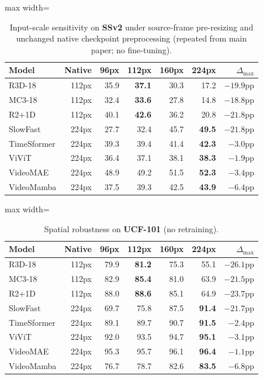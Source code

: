 \documentclass[runningheads]{llncs}
\newcommand{\tabtight}{\setlength{\tabcolsep}{3.5pt}\renewcommand{\arraystretch}{1.12}}
\newcommand{\rev}[1]{\textcolor{revblue}{#1}}
\begin{document}
\begin{table}[!htbp]
\centering
\caption{\rev{Input-scale sensitivity on \textbf{SSv2} under source-frame pre-resizing and unchanged native checkpoint preprocessing (repeated from main paper; no fine-tuning).}}
\label{tab:sup_sp_ssv2}
\scriptsize\tabtight
\begin{adjustbox}{max width=\textwidth}
\begin{tabular}{l r rrrr r}
\toprule
Model & Native & 96px & 112px & 160px & 224px & $\Delta_\text{max}$ \\
\midrule
R3D-18      & 112px & 35.9 & \textbf{37.1} & 30.3 & 17.2 & $-19.9$pp \\
MC3-18      & 112px & 32.4 & \textbf{33.6} & 27.8 & 14.8 & $-18.8$pp \\
R2+1D       & 112px & 40.1 & \textbf{42.6} & 36.2 & 20.8 & $-21.8$pp \\
SlowFast    & 224px & 27.7 & 32.4 & 45.7 & \textbf{49.5} & $-21.8$pp \\
\midrule
TimeSformer & 224px & 39.3 & 39.4 & 41.4 & \textbf{42.3} & $-3.0$pp \\
ViViT       & 224px & 36.4 & 37.1 & 38.1 & \textbf{38.3} & $-1.9$pp \\
VideoMAE    & 224px & 48.9 & 49.2 & 51.5 & \textbf{52.3} & $-3.4$pp \\
VideoMamba  & 224px & 37.5 & 39.3 & 42.5 & \textbf{43.9} & $-6.4$pp \\
\bottomrule
\end{tabular}
\end{adjustbox}
\end{table}

\begin{table}[!htbp]
\centering
\caption{Spatial robustness on \textbf{UCF-101} (no retraining).}
\label{tab:sup_sp_ucf}
\scriptsize\tabtight
\begin{adjustbox}{max width=\textwidth}
\begin{tabular}{l r rrrr r}
\toprule
Model & Native & 96px & 112px & 160px & 224px & $\Delta_\text{max}$ \\
\midrule
R3D-18      & 112px & 79.9 & \textbf{81.2} & 75.3 & 55.1 & $-26.1$pp \\
MC3-18      & 112px & 82.9 & \textbf{85.4} & 81.0 & 63.9 & $-21.5$pp \\
R2+1D       & 112px & 88.0 & \textbf{88.6} & 85.1 & 64.9 & $-23.7$pp \\
SlowFast    & 224px & 69.7 & 75.8 & 87.5 & \textbf{91.4} & $-21.7$pp \\
\midrule
TimeSformer & 224px & 89.1 & 89.7 & 90.7 & \textbf{91.5} & $-2.4$pp \\
ViViT       & 224px & 92.0 & 93.5 & 94.7 & \textbf{95.1} & $-3.1$pp \\
VideoMAE    & 224px & 95.3 & 95.7 & 96.1 & \textbf{96.4} & $-1.1$pp \\
VideoMamba  & 224px & 76.7 & 78.7 & 82.6 & \textbf{83.5} & $-6.8$pp \\
\bottomrule
\end{tabular}
\end{adjustbox}
\end{table}
\end{document}
